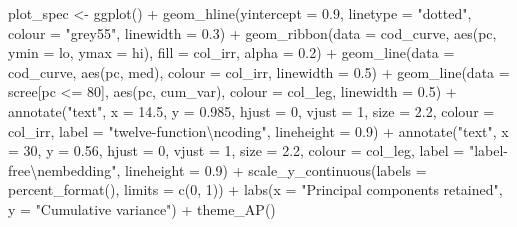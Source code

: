 \documentclass[
  11pt,
]{article}
\newenvironment{Shaded}{\begin{snugshade}}{\end{snugshade}}
\newcommand{\AttributeTok}[1]{\textcolor[rgb]{0.77,0.63,0.00}{#1}}
\newcommand{\DecValTok}[1]{\textcolor[rgb]{0.00,0.00,0.81}{#1}}
\newcommand{\FloatTok}[1]{\textcolor[rgb]{0.00,0.00,0.81}{#1}}
\newcommand{\FunctionTok}[1]{\textcolor[rgb]{0.00,0.00,0.00}{#1}}
\newcommand{\NormalTok}[1]{#1}
\newcommand{\OtherTok}[1]{\textcolor[rgb]{0.56,0.35,0.01}{#1}}
\newcommand{\SpecialCharTok}[1]{\textcolor[rgb]{0.00,0.00,0.00}{#1}}
\newcommand{\StringTok}[1]{\textcolor[rgb]{0.31,0.60,0.02}{#1}}
\begin{document}
\begin{Shaded}
\begin{Highlighting}[]
\NormalTok{plot\_spec }\OtherTok{\textless{}{-}} \FunctionTok{ggplot}\NormalTok{() }\SpecialCharTok{+}
  \FunctionTok{geom\_hline}\NormalTok{(}\AttributeTok{yintercept =} \FloatTok{0.9}\NormalTok{, }\AttributeTok{linetype =} \StringTok{"dotted"}\NormalTok{, }\AttributeTok{colour =} \StringTok{"grey55"}\NormalTok{,}
             \AttributeTok{linewidth =} \FloatTok{0.3}\NormalTok{) }\SpecialCharTok{+}
  \FunctionTok{geom\_ribbon}\NormalTok{(}\AttributeTok{data =}\NormalTok{ cod\_curve, }\FunctionTok{aes}\NormalTok{(pc, }\AttributeTok{ymin =}\NormalTok{ lo, }\AttributeTok{ymax =}\NormalTok{ hi), }\AttributeTok{fill =}\NormalTok{ col\_irr,}
              \AttributeTok{alpha =} \FloatTok{0.2}\NormalTok{) }\SpecialCharTok{+}
  \FunctionTok{geom\_line}\NormalTok{(}\AttributeTok{data =}\NormalTok{ cod\_curve, }\FunctionTok{aes}\NormalTok{(pc, med), }\AttributeTok{colour =}\NormalTok{ col\_irr, }\AttributeTok{linewidth =} \FloatTok{0.5}\NormalTok{) }\SpecialCharTok{+}
  \FunctionTok{geom\_line}\NormalTok{(}\AttributeTok{data =}\NormalTok{ scree[pc }\SpecialCharTok{\textless{}=} \DecValTok{80}\NormalTok{], }\FunctionTok{aes}\NormalTok{(pc, cum\_var), }\AttributeTok{colour =}\NormalTok{ col\_leg,}
            \AttributeTok{linewidth =} \FloatTok{0.5}\NormalTok{) }\SpecialCharTok{+}
  \FunctionTok{annotate}\NormalTok{(}\StringTok{"text"}\NormalTok{, }\AttributeTok{x =} \FloatTok{14.5}\NormalTok{, }\AttributeTok{y =} \FloatTok{0.985}\NormalTok{, }\AttributeTok{hjust =} \DecValTok{0}\NormalTok{, }\AttributeTok{vjust =} \DecValTok{1}\NormalTok{, }\AttributeTok{size =} \FloatTok{2.2}\NormalTok{,}
           \AttributeTok{colour =}\NormalTok{ col\_irr, }\AttributeTok{label =} \StringTok{"twelve{-}function}\SpecialCharTok{\textbackslash{}n}\StringTok{coding"}\NormalTok{, }\AttributeTok{lineheight =} \FloatTok{0.9}\NormalTok{) }\SpecialCharTok{+}
  \FunctionTok{annotate}\NormalTok{(}\StringTok{"text"}\NormalTok{, }\AttributeTok{x =} \DecValTok{30}\NormalTok{, }\AttributeTok{y =} \FloatTok{0.56}\NormalTok{, }\AttributeTok{hjust =} \DecValTok{0}\NormalTok{, }\AttributeTok{vjust =} \DecValTok{1}\NormalTok{, }\AttributeTok{size =} \FloatTok{2.2}\NormalTok{,}
           \AttributeTok{colour =}\NormalTok{ col\_leg, }\AttributeTok{label =} \StringTok{"label{-}free}\SpecialCharTok{\textbackslash{}n}\StringTok{embedding"}\NormalTok{, }\AttributeTok{lineheight =} \FloatTok{0.9}\NormalTok{) }\SpecialCharTok{+}
  \FunctionTok{scale\_y\_continuous}\NormalTok{(}\AttributeTok{labels =} \FunctionTok{percent\_format}\NormalTok{(), }\AttributeTok{limits =} \FunctionTok{c}\NormalTok{(}\DecValTok{0}\NormalTok{, }\DecValTok{1}\NormalTok{)) }\SpecialCharTok{+}
  \FunctionTok{labs}\NormalTok{(}\AttributeTok{x =} \StringTok{"Principal components retained"}\NormalTok{, }\AttributeTok{y =} \StringTok{"Cumulative variance"}\NormalTok{) }\SpecialCharTok{+}
  \FunctionTok{theme\_AP}\NormalTok{()}


\end{Highlighting}
\end{Shaded}
\end{document}

